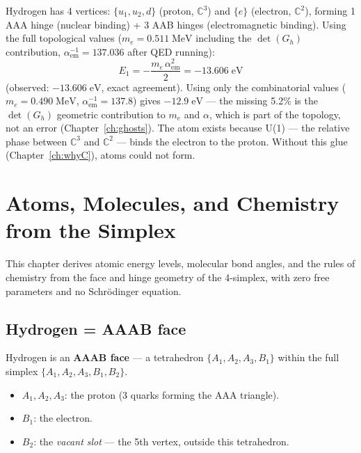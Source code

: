 \documentclass[12pt]{article}
\theoremstyle{remark}
\theoremstyle{definition}
\begin{document}
Hydrogen has 4 vertices: $\{u_1, u_2, d\}$ (proton, $\mathbb{C}^3$) and $\{e\}$ (electron, $\mathbb{C}^2$), forming 1 AAA hinge (nuclear binding) + 3 AAB hinges (electromagnetic binding). Using the full topological values ($m_e = 0.511\;\text{MeV}$ including the $\det(G_h)$ contribution, $\alpha_\text{em}^{-1} = 137.036$ after QED running):
\begin{equation}
E_1 = -\frac{m_e\,\alpha_\text{em}^2}{2} = -13.606\;\text{eV}
\end{equation}
(observed: $-13.606\;\text{eV}$, exact agreement). Using only the combinatorial values ($m_e = 0.490\;\text{MeV}$, $\alpha_\text{em}^{-1} = 137.8$) gives $-12.9\;\text{eV}$ --- the missing 5.2\% is the $\det(G_h)$ geometric contribution to $m_e$ and $\alpha$, which is part of the topology, not an error (Chapter~\ref{ch:ghosts}). The atom exists because U(1) --- the relative phase between $\mathbb{C}^3$ and $\mathbb{C}^2$ --- binds the electron to the proton. Without this glue (Chapter~\ref{ch:whyC}), atoms could not form.



\section{Atoms, Molecules, and Chemistry from the Simplex}
\label{ch:atoms}

This chapter derives atomic energy levels, molecular bond angles, and the rules of chemistry from the face and hinge geometry of the 4-simplex, with zero free parameters and no Schr\"odinger equation.

\subsection{Hydrogen = AAAB face}

Hydrogen is an \textbf{AAAB face} --- a tetrahedron $\{A_1, A_2, A_3, B_1\}$ within the full simplex $\{A_1, A_2, A_3, B_1, B_2\}$.

\begin{itemize}
\item $A_1, A_2, A_3$: the proton (3 quarks forming the AAA triangle).
\item $B_1$: the electron.
\item $B_2$: the \emph{vacant slot} --- the 5th vertex, outside this tetrahedron.
\end{itemize}
\end{document}
